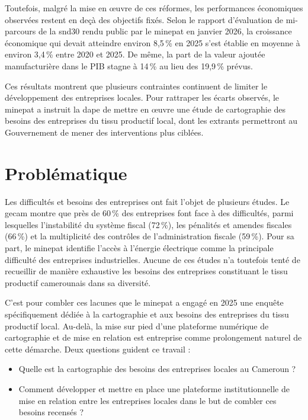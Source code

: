 \documentclass[12pt, a4paper, oneside]{report}
\begin{document}
Toutefois, malgré la mise en œuvre de ces réformes, les performances économiques observées restent en deçà des objectifs fixés. Selon le rapport d'évaluation de mi-parcours de la \gls{snd30} rendu public par le \gls{minepat} en janvier 2026, la croissance économique qui devait atteindre environ 8,5\,\% en 2025 s'est établie en moyenne à environ 3,4\,\% entre 2020 et 2025. De même, la part de la valeur ajoutée manufacturière dans le PIB stagne à 14\,\% au lieu des 19,9\,\% prévus.

Ces résultats montrent que plusieurs contraintes continuent de limiter le développement des entreprises locales. Pour rattraper les écarts observés, le \gls{minepat} a instruit la \gls{dape} de mettre en œuvre une étude de cartographie des besoins des entreprises du tissu productif local, dont les extrants permettront au Gouvernement de mener des interventions plus ciblées.

\section*{Problématique}

Les difficultés et besoins des entreprises ont fait l'objet de plusieurs études. Le \gls{gecam} \cite{gecam2019} montre que près de 60\,\% des entreprises font face à des difficultés, parmi lesquelles l'instabilité du système fiscal (72\,\%), les pénalités et amendes fiscales (66\,\%) et la multiplicité des contrôles de l'administration fiscale (59\,\%). Pour sa part, le \gls{minepat} \cite{minepat2022} identifie l'accès à l'énergie électrique comme la principale difficulté des entreprises industrielles. Aucune de ces études n'a toutefois tenté de recueillir de manière exhaustive les besoins des entreprises constituant le tissu productif camerounais dans sa diversité.

C'est pour combler ces lacunes que le \gls{minepat} a engagé en 2025 une enquête spécifiquement dédiée à la cartographie et aux besoins des entreprises du tissu productif local. Au-delà, la mise sur pied d'une plateforme numérique de cartographie et de mise en relation est entreprise comme prolongement naturel de cette démarche. Deux questions guident ce travail :

\begin{itemize}
  \item Quelle est la cartographie des besoins des entreprises locales au Cameroun ?
  \item Comment développer et mettre en place une plateforme institutionnelle de mise en relation entre les entreprises locales dans le but de combler ces besoins recensés ?
\end{itemize}
\end{document}
